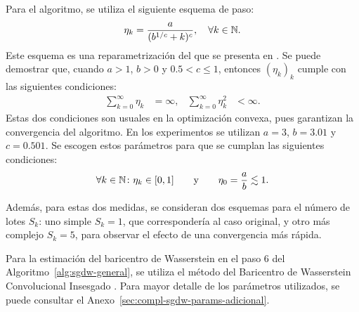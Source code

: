 Para el algoritmo, se utiliza el siguiente esquema de paso:
\begin{equation}\label{eq:esquema-paso}
    \eta_k = \frac{a}{(b^{1/c} + k)^c},\quad \forall k \in \mathbb{N}.
\end{equation}
Este esquema es una reparametrización del que se presenta en \cite[Secc.~2]{welling2011bayesian}. Se puede demostrar que, cuando $a > 1$, $b > 0$ y $0.5 < c \leq 1$, entonces $(\eta_k)_{k}$ cumple con las siguientes condiciones:
\begin{align}
    \sum_{k=0}^{\infty} \eta_k   & = \infty, &
    \sum_{k=0}^{\infty} \eta_k^2 & < \infty.
\end{align}
Estas dos condiciones son usuales en la optimización convexa, pues garantizan la convergencia del algoritmo. En los experimentos se utilizan $a = 3$, $b = 3.01$ y $c = 0.501$. Se escogen estos parámetros para que se cumplan las siguientes condiciones:
\begin{equation}
    \forall k\in\mathbb{N} \colon \eta_k\in[0, 1]\qquad \text{y} \qquad \eta_0 = \frac{a}{b} \lesssim 1.
\end{equation}

Además, para estas dos medidas, se consideran dos esquemas para el número de lotes $S_k$: uno simple $S_k = 1$, que correspondería al caso original, y otro más complejo $S_k = 5$, para observar el efecto de una convergencia más rápida.

Para la estimación del baricentro de Wasserstein en el paso 6 del Algoritmo~\ref{alg:sgdw-general}, se utiliza el método del Baricentro de Wasserstein Convolucional Insesgado \cite{janati2020debiased}. Para mayor detalle de los parámetros utilizados, se puede consultar el Anexo~\ref{sec:compl-sgdw-params-adicional}.

